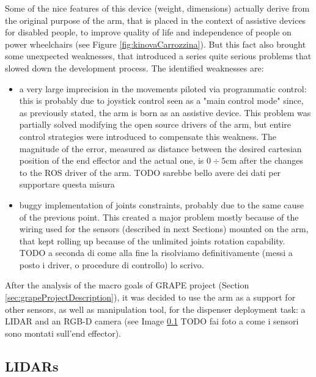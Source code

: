  Some of the nice features of this device (weight, dimensions) actually derive from the original purpose of the arm, that is placed in the context of assistive devices for disabled people, to improve quality of life and independence of people on  power wheelchairs (see Figure \ref{fig:kinovaCarrozzina}). But this fact also brought some unexpected weaknesses, that introduced a series quite serious problems that slowed down the development process. The identified weaknesses are:
 \begin{itemize}
 	\item a very large imprecision in the movements piloted via programmatic control: this is probably due to joystick control seen as a "main control mode" since, as previously stated, the arm is born as an assistive device. This problem was partially solved modifying the open source drivers of the arm, but entire control strategies were introduced to compensate this weakness. The magnitude of the error, measured as distance between the desired cartesian position of the end effector and the actual one, is $0\div5$cm after the changes to the \ac{ROS} driver of the arm. TODO sarebbe bello avere dei dati per supportare questa misura
 	\item buggy implementation of joints constraints, probably due to the same cause of the previous point. This created a major problem mostly because of the wiring used for the sensors (described in next Sections) mounted on the arm, that kept rolling up because of the unlimited joints rotation capability. TODO a seconda di come alla fine la risolviamo definitivamente (messi a posto i driver, o procedure di controllo) lo scrivo.
 \end{itemize}
 
After the analysis of the macro goals of \ac{GRAPE} project (Section \ref{sec:grapeProjectDescription}), it was decided to use the arm as a support for other sensors, as well as manipulation tool, for the dispenser deployment task: a \ac{LIDAR} and an RGB-D camera (see Image \ref{} TODO fai foto a come i sensori sono montati sull'end effector).
 
 \subsection{LIDARs}
 
